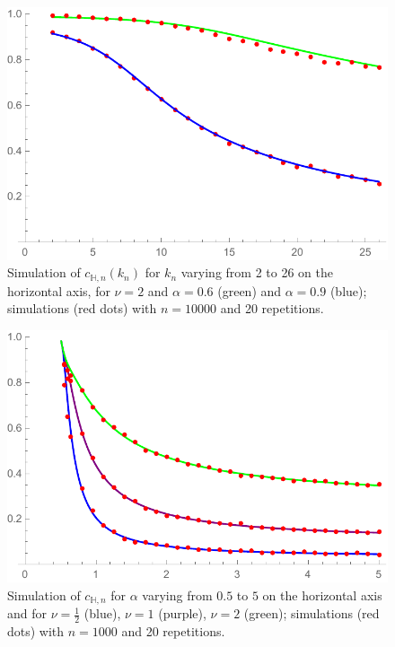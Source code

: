 \begin{figure}
    \centering
    \includegraphics[scale=0.6]{figures/sim1024ck225n10000a0609nu2rep20.pdf}
    \caption{Simulation of $c_{\mathbb{H},n}(k_n)$ for $k_n$ varying from 2 to 26 on the horizontal axis, for $\nu=2$ and $\alpha=0.6$ (green) and $\alpha=0.9$ (blue); simulations (red dots) with $n=10 000$ and 20 repetitions.}
    \label{fig:ckvariable}
\end{figure}
\begin{figure}
    \centering
    \includegraphics[scale=0.6]{figures/SimulationClusteringCoefficientVariousNu.pdf}
    \caption{Simulation of $c_{\mathbb{H},n}$ for $\alpha$ varying from $0.5$ to $5$ on the horizontal axis and for $\nu=\frac{1}{2}$ (blue), $\nu=1$ (purple), $\nu=2$ (green); simulations (red dots) with $n=1 000$ and 20 repetitions.}
    \label{fig:cvariable}
\end{figure}

